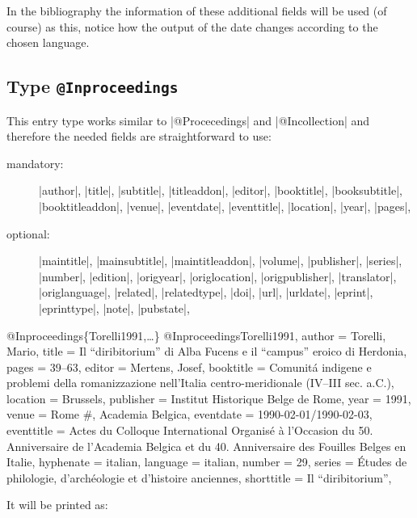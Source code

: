 \documentclass[a4paper,
10pt,
greek,
french,
spanish,
italian,
ngerman,
english
]{ltxdoc}
\begin{document}
In the bibliography the information of these additional fields will be used (of course) as this, notice how the output of the date changes according to the chosen language.

\subsection{Type \texttt{@Inproceedings}}\label{inproceedings}
This entry type works similar to |@Procecedings| and |@Incollection| and therefore the needed fields are straightforward to use:

\begin{description}
\item[mandatory:] 
|author|, |title|, |subtitle|, |titleaddon|,
|editor|,  |booktitle|, |booksubtitle|, |booktitleaddon|,
|venue|, |eventdate|, |eventtitle|,
|location|, |year|, |pages|, 
\item[optional:]
|maintitle|, |mainsubtitle|, |maintitleaddon|, |volume|, 
|publisher|, |series|, |number|, |edition|, 
|origyear|, |origlocation|, |origpublisher|, 
|translator|, |origlanguage|,
|related|, |relatedtype|,
|doi|, |url|, |urldate|, |eprint|, |eprinttype|, |note|, |pubstate|, 
\end{description}
 
 
 
 \begin{bibexample}[label=Torelli1991]{{@}Inproceedings\{Torelli1991,…\}}
@Inproceedings{Torelli1991,
  author     = {Torelli, Mario},
  title      = {Il \enquote{diribitorium} di Alba Fucens e il \enquote{campus} eroico di Herdonia},
  pages      = {39--63},
  editor     = {Mertens, Josef},
  booktitle  = {Comunitá indigene e problemi della romanizzazione nell’Italia centro\--meri\-dionale (IV--III sec. a.C.)},
  location   = Brussels,     %
  publisher  = {Institut Historique Belge de Rome},
  year       = {1991},
  venue      = Rome #{, Academia Belgica},    %
  eventdate  = {1990-02-01/1990-02-03},
  eventtitle = {Actes du Colloque International Organisé à l'Occasion du 50. Anniversaire de l'Academia Belgica et du 40. Anniversaire des Fouilles Belges en Italie},
  hyphenate  = {italian},
  language   = {italian},
  number     = {29},
  series     = {Études de philologie, d'archéologie et d'histoire anciennes},
  shorttitle = {Il \enquote{diribitorium}},
}
\end{bibexample}
It will be printed as:
 
\end{document}
